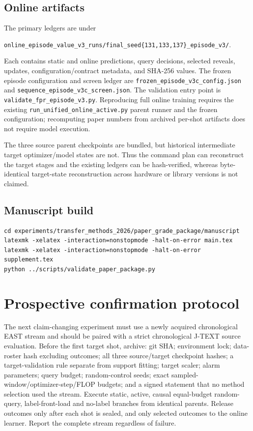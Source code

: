 \documentclass[10pt]{article}
\newcommand{\jtext}{J-TEXT}
\newcommand{\east}{EAST}
\newcommand{\code}[1]{\nolinkurl{#1}}
\begin{document}
\subsection{Online artifacts}

The primary ledgers are under
\begin{center}
\code{online\_episode\_value\_v3\_runs/final\_seed\{131,133,137\}\_episode\_v3/}.
\end{center}
Each contains static and online predictions, query decisions, selected reveals, updates, configuration/contract metadata, and SHA-256 values.  The frozen episode configuration and screen ledger are \code{frozen\_episode\_v3c\_config.json} and \code{sequence\_episode\_v3c\_screen.json}.  The validation entry point is \code{validate\_fpr\_episode\_v3.py}.  Reproducing full online training requires the existing \code{run\_unified\_online\_active.py} parent runner and the frozen configuration; recomputing paper numbers from archived per-shot artifacts does not require model execution.

The three source parent checkpoints are bundled, but historical intermediate target optimizer/model states are not.  Thus the command plan can reconstruct the target stages and the existing ledgers can be hash-verified, whereas byte-identical target-state reconstruction across hardware or library versions is not claimed.

\subsection{Manuscript build}

\begin{verbatim}
cd experiments/transfer_methods_2026/paper_grade_package/manuscript
latexmk -xelatex -interaction=nonstopmode -halt-on-error main.tex
latexmk -xelatex -interaction=nonstopmode -halt-on-error supplement.tex
python ../scripts/validate_paper_package.py
\end{verbatim}

\section{Prospective confirmation protocol}

The next claim-changing experiment must use a newly acquired chronological \east{} stream and should be paired with a strict chronological \jtext{} source evaluation.  Before the first target shot, archive: git SHA; environment lock; data-roster hash excluding outcomes; all three source/target checkpoint hashes; a target-validation rule separate from support fitting; target scaler; alarm parameters; query budget; random-control seeds; exact sampled-window/optimizer-step/FLOP budgets; and a signed statement that no method selection used the stream.  Execute static, active, causal equal-budget random-query, label-front-load and no-label branches from identical parents.  Release outcomes only after each shot is sealed, and only selected outcomes to the online learner.  Report the complete stream regardless of failure.
\end{document}
